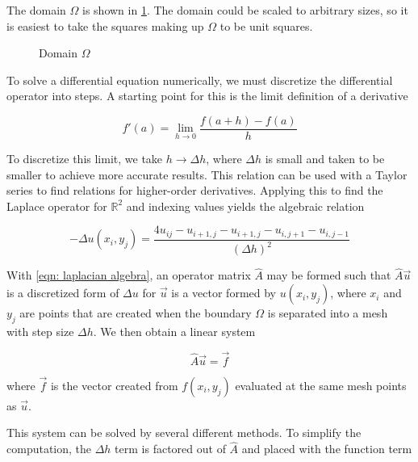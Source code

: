 \documentclass[10pt,a4paper]{article}
\begin{document}
The domain $\Omega$ is shown in \cref{fig: domain}. The domain could be scaled to arbitrary sizes, so it is easiest to take the squares making up $\Omega$ to be unit squares.

\begin{figure}[H]
\center
{}
\caption{Domain $\Omega$}
\label{fig: domain}
\end{figure}

To solve a differential equation numerically, we must discretize the differential operator into steps. A starting point for this is the limit definition of a derivative

\begin{equation}
\label{eqn: limit derivative}
f'(a) = \lim\limits_{h \to 0} \frac{f(a + h) - f(a)}{h}
\end{equation}

To discretize this limit, we take $h \to \Delta h$, where $\Delta h$ is small and taken to be smaller to achieve more accurate results. This relation can be used with a Taylor series to find relations for higher-order derivatives. Applying this to find the Laplace operator for $\mathbb{R}^2$ and indexing values yields the algebraic relation

\begin{equation}
\label{eqn: laplacian algebra}
- \Delta u(x_i, y_j) = \frac{4u_{ij} - u_{i+1, j} - u_{i+1, j} - u_{i, j+1} - u_{i, j-1}}{\left( \Delta h \right)^2}
\end{equation}

With \cref{eqn: laplacian algebra}, an operator matrix $\hat{A}$ may be formed such that $\hat{A} \vec{u}$ is a discretized form of $\Delta u$ for $\vec{u}$ is a vector formed by $u(x_i, y_j)$, where $x_i$ and $y_j$ are  points that are created when the boundary $\Omega$ is separated into a mesh with step size $\Delta h$. We then obtain a linear system

\begin{equation}
\label{eqn: linear system}
\hat{A} \vec{u} = \vec{f}
\end{equation}

where $\vec{f}$ is the vector created from $f(x_i, y_j)$ evaluated at the same mesh points as $\vec{u}$. 

This system can be solved by several different methods. To simplify the computation, the $\Delta h$ term is factored out of $\hat{A}$ and placed with the function term
\end{document}
